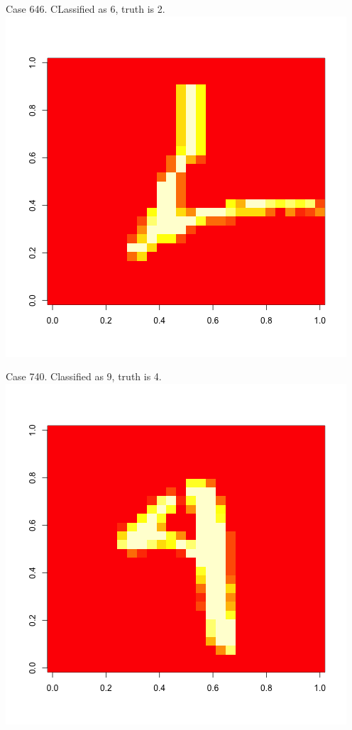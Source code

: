 \documentclass[10pt]{extarticle}
\begin{document}
Case 646. CLassified as 6, truth is 2. 
\includegraphics[scale=.4] {../Images/646.png}

Case 740. Classified as 9, truth is 4. 
\includegraphics[scale=.4] {../Images/740.png}
\end{document}
